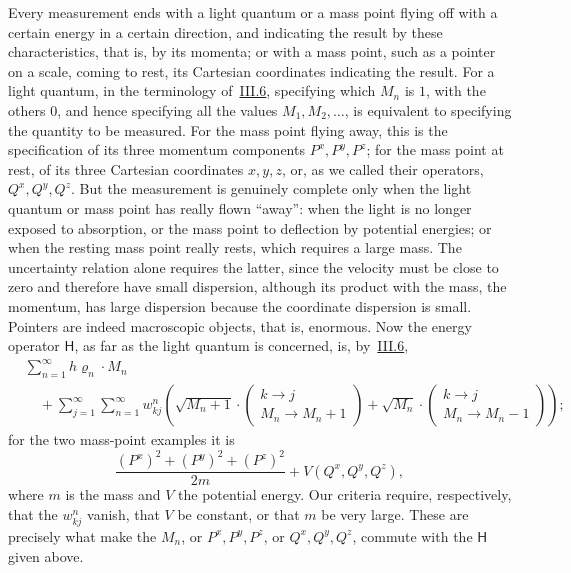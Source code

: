 \documentclass[fontsize=13pt,twoside,openany,headings=normal,parskip=false,bookmarkpackage=false,DIV=calc]{scrbook}
\begin{document}
Every measurement ends with a light quantum or a mass point flying off with a certain energy in a certain direction, and indicating the result by these characteristics, that is, by its momenta; or with a mass point, such as a pointer on a scale, coming to rest, its Cartesian coordinates indicating the result. For a light quantum, in the terminology of~\hyperref[sec:III.6]{III.6}, specifying which $M_n$ is $1$, with the others $0$, and hence specifying all the values $M_1,M_2,\ldots$, is equivalent to specifying the quantity to be measured. For the mass point flying away, this is the specification of its three momentum components $P^x,P^y,P^z$; for the mass point at rest, of its three Cartesian coordinates $x,y,z$, or, as we called their operators, $Q^x,Q^y,Q^z$. But the measurement is genuinely complete only when the light quantum or mass point has really flown ``away'': when the light is no longer exposed to absorption, or the mass point to deflection by potential energies; or when the resting mass point really rests, which requires a large mass. The uncertainty relation alone requires the latter, since the velocity must be close to zero and therefore have small dispersion, although its product with the mass, the momentum, has large dispersion because the coordinate dispersion is small. Pointers are indeed macroscopic objects, that is, enormous. Now the energy operator $\mathsf{H}$, as far as
\hypertarget{origpage-190}{}%
the light quantum is concerned, is, by~\hyperref[sec:III.6]{III.6},
\begin{align*}
&\sum_{n=1}^{\infty}h\varrho_n\cdot M_n\\
&\quad+\sum_{j=1}^{\infty}\sum_{n=1}^{\infty}w_{kj}^{n}
\left(\sqrt{M_n+1}\cdot\begin{pmatrix}k\to j\\M_n\to M_n+1\end{pmatrix}
+\sqrt{M_n}\cdot\begin{pmatrix}k\to j\\M_n\to M_n-1\end{pmatrix}\right);
\end{align*}
for the two mass-point examples it is
\[
\frac{(P^x)^2+(P^y)^2+(P^z)^2}{2m}+V(Q^x,Q^y,Q^z),
\]
where $m$ is the mass and $V$ the potential energy. Our criteria require, respectively, that the $w_{kj}^n$ vanish, that $V$ be constant, or that $m$ be very large. These are precisely what make the $M_n$, or $P^x,P^y,P^z$, or $Q^x,Q^y,Q^z$, commute with the $\mathsf{H}$ given above.
\end{document}

